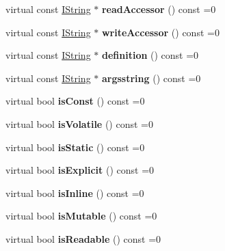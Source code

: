 \begin{DoxyCompactItemize}
virtual const \mbox{\hyperlink{class_i_string}{I\+String}} $\ast$ {\bfseries read\+Accessor} () const =0
\item 
\mbox{\label{class_i_member_a80f1ebc1bbbfa87ea9969dab464e8a55}} 
virtual const \mbox{\hyperlink{class_i_string}{I\+String}} $\ast$ {\bfseries write\+Accessor} () const =0
\item 
\mbox{\label{class_i_member_a919bc2bd4531f02c77ac43697ea34d90}} 
virtual const \mbox{\hyperlink{class_i_string}{I\+String}} $\ast$ {\bfseries definition} () const =0
\item 
\mbox{\label{class_i_member_aeee3310aaa39691c85f9e9017802f90b}} 
virtual const \mbox{\hyperlink{class_i_string}{I\+String}} $\ast$ {\bfseries argsstring} () const =0
\item 
\mbox{\label{class_i_member_a3c28cd31f2dfe490fb7dd6d27f958327}} 
virtual bool {\bfseries is\+Const} () const =0
\item 
\mbox{\label{class_i_member_aa1e4d1d60b70a0cfa0e2fe6fec9f4cbc}} 
virtual bool {\bfseries is\+Volatile} () const =0
\item 
\mbox{\label{class_i_member_a7eb70f5d8226e4c00a6abbeadaca9c94}} 
virtual bool {\bfseries is\+Static} () const =0
\item 
\mbox{\label{class_i_member_adbb42374989740c9307195d62859be33}} 
virtual bool {\bfseries is\+Explicit} () const =0
\item 
\mbox{\label{class_i_member_a6f009c22d804c702ebccc411c9843723}} 
virtual bool {\bfseries is\+Inline} () const =0
\item 
\mbox{\label{class_i_member_a6c43d4a96ebb1006e65c0e13b2f421bd}} 
virtual bool {\bfseries is\+Mutable} () const =0
\item 
\mbox{\label{class_i_member_a6bf26024d267ccded87fa9ff7864e971}} 
virtual bool {\bfseries is\+Readable} () const =0
\item 
\mbox{\label{class_i_member_ab8a6588e64ee9650291982660116ccfd}} 

\end{DoxyCompactItemize}
